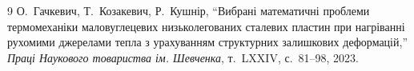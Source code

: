 \renewcommand{\refname}{Список використаних джерел}
\begin{thebibliography}{9}
О.~Гачкевич, Т.~Козакевич, Р.~Кушнір,
``Вибрані математичні проблеми термомеханіки маловуглецевих низьколегованих сталевих пластин при нагріванні рухомими джерелами тепла з урахуванням структурних залишкових деформацій,''
\emph{Праці Наукового товариства ім. Шевченка}, т.~LXXIV, с.~81--98, 2023.
\end{thebibliography}
